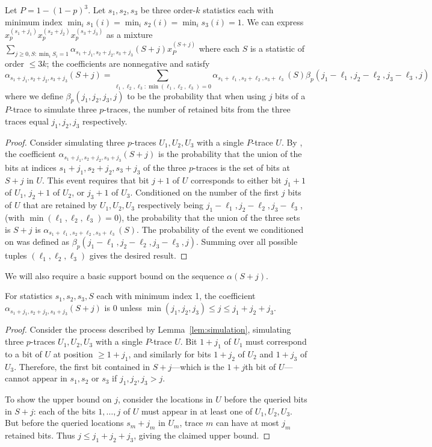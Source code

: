 \documentclass[11pt]{article}
\theoremstyle{plain}
\begin{document}
\begin{lemma}\label{lem:beta}
Let $P=1-(1-p)^3$. Let $s_1,s_2,s_3$ be three order-$k$ statistics each with minimum index $\min_i s_1(i)=\min_i s_2(i)=\min_i s_3(i)=1$. We can express $x_p^{(s_1+j_1)}x_p^{(s_2+j_2)}x_p^{(s_3+j_3)}$ as a mixture $\sum_{j\geq 0, S:\min_i S_i=1} \alpha_{s_1+j_1,s_2+j_2,s_3+j_3}(S+j) x_P^{(S+j)}$ where each $S$ is a statistic of order $\leq 3k$; the coefficients are nonnegative and satisfy \[\alpha_{s_1+j_1,s_2+j_2,s_3+j_3}(S+j)=\sum_{\ell_1,\ell_2,\ell_3:\min(\ell_1,\ell_2,\ell_3)=0} \alpha_{s_1+\ell_1,s_2+\ell_2,s_3+\ell_3}(S) \beta_p(j_1-\ell_1,j_2-\ell_2,j_3-\ell_3,j)\]
where we define $\beta_p(j_1,j_2,j_3,j)$ to be the probability that when using $j$ bits of a $P$-trace to simulate three $p$-traces, the number of retained bits from the three traces equal $j_1,j_2,j_3$ respectively.
\end{lemma}
\begin{proof}
    Consider simulating three $p$-traces $U_1,U_2,U_3$ with a single $P$-trace $U$.
    By , the coefficient $\alpha_{s_1+j_1,s_2+j_2,s_3+j_3}(S+j)$ is the probability that the union of the bits at indices $s_1+j_1,s_2+j_2,s_3+j_3$ of the three $p$-traces is the set of bits at $S+j$ in $U$. This event requires that bit $j+1$ of $U$ corresponds to either bit $j_1+1$ of $U_1$, $j_2+1$ of $U_2$, or $j_3+1$ of $U_3$. Conditioned on the number of the first $j$ bits of $U$ that are retained by $U_1,U_2,U_3$ respectively being $j_1-\ell_1,j_2-\ell_2,j_3-\ell_3$, (with $\min(\ell_1,\ell_2,\ell_3) = 0$), the probability that the union of the three sets is $S+j$ is $\alpha_{s_1+\ell_1,s_2+\ell_2,s_3+\ell_3}(S)$. The probability of the event we conditioned on was defined as $\beta_p(j_1-\ell_1,j_2-\ell_2,j_3-\ell_3,j)$.    
    Summing over all possible tuples $(\ell_1,\ell_2,\ell_3)$ gives the desired result. 
\end{proof}

We will also require a basic support bound on the sequence $\alpha(S+j)$. 

\begin{lemma}\label{lem:alpha-range}
For statistics $s_1,s_2,s_3,S$ each with minimum index 1, the coefficient $\alpha_{s_1+j_1,s_2+j_2,s_3+j_3}(S+j)$ is 0 unless $\min(j_1,j_2,j_3)\leq j\leq j_1+j_2+j_3$.
\end{lemma}
\begin{proof}
    Consider the process described by Lemma~\ref{lem:simulation}, simulating three $p$-traces $U_1,U_2,U_3$ with a single $P$-trace $U$. Bit $1+j_1$ of $U_1$ must correspond to a bit of $U$ at position $\geq 1+j_1$, and similarly for bits $1+j_2$ of $U_2$ and $1+j_3$ of $U_3$. Therefore, the first bit contained in $S+j$---which is the $1+j$th bit of $U$---cannot appear in $s_1,s_2$ or $s_3$ if $j_1,j_2,j_3 > j$. 

    To show the upper bound on $j$, consider the locations in $U$ before the queried bits in $S+j$: each of the bits $1,\ldots,j$ of $U$ must appear in at least one of $U_1,U_2,U_3$. But before the queried locations $s_m+j_m$ in $U_m$, trace $m$ can have at most $j_m$ retained bits. Thus $j\leq j_1+j_2+j_3$, giving the claimed upper bound. 
\end{proof}
\end{document}
